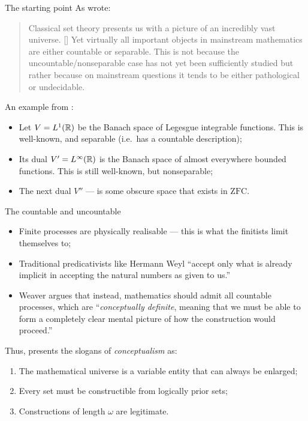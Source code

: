 \documentclass{beamer}
\newcommand{\highlight}[1]{{\usebeamercolor[fg]{frametitle}\emph{#1}}}
\begin{document}
\begin{frame}{The starting point}
  As  wrote:
  \begin{quotation}
    Classical set theory presents us with a picture of an incredibly vast universe. [\textellipsis] Yet virtually all important objects in mainstream mathematics are either countable or separable. This is not because the uncountable/nonseparable case has not yet been sufficiently studied but rather because on mainstream questions it tends to be either pathological or undecidable.
  \end{quotation}

  \pause

  \vspace{0.6em}

  An example from :
  \begin{itemize}
    \item Let $V = L^1\mleft(\mathbb{R}\mright)$ be the Banach space of Legesgue integrable functions. This is well-known, and separable (i.e.\ has a countable description);
    \item Its dual $V' = L^\infty\mleft(\mathbb{R}\mright)$ is the Banach space of almost everywhere bounded functions. This is still well-known, but nonseparable;
    \item The next dual $V''$ --- is some obscure space that exists in $\mathrm{ZFC}$.
  \end{itemize}
\end{frame}

\begin{frame}{The countable and uncountable}
  \begin{itemize}
    \item Finite processes are physically realisable --- this is what the finitists limit themselves to;
    \item Traditional predicativists like Hermann Weyl ``accept only
          what is already implicit in accepting the natural numbers as given to us.''
    \item Weaver argues that instead, mathematics should admit all countable processes, which are ``\highlight{conceptually definite}, meaning that we must be able to form a completely clear mental picture of how the construction would proceed.'' \cite{weaver05-conceptualism}
  \end{itemize}

  \pause

  \vspace{0.6em}

  Thus,  presents the slogans of \emph{conceptualism} as:
  \begin{enumerate}
    \item The mathematical universe is a variable entity that can always be enlarged;
    \item Every set must be constructible from logically prior sets;
    \item Constructions of length $\omega$ are legitimate.
  \end{enumerate}
\end{frame}
\end{document}
